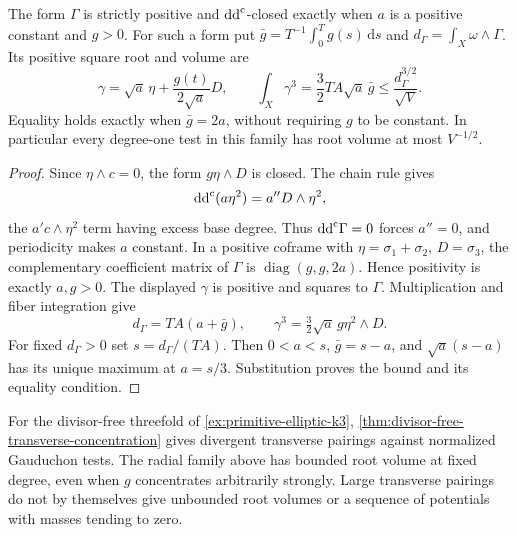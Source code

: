 \begin{proposition}\label{prop:primitive-radial-root-volume}
The form $\Gamma$ is strictly positive and $\mathrm{dd}^{\mathrm{c}}$-closed exactly when $a$ is a positive constant and $g>0$. For such a form put $\bar g=T^{-1}\int_0^Tg(s)\,\mathrm ds$ and $d_\Gamma=\int_X\omega\wedge\Gamma$. Its positive square root and volume are
\[
 \gamma=\sqrt a\,\eta+\frac{g(t)}{2\sqrt a}D,
 \qquad
 \int_X\gamma^3=\frac32TA\sqrt a\,\bar g
       \leq\frac{d_\Gamma^{3/2}}{\sqrt V}.
\]
Equality holds exactly when $\bar g=2a$, without requiring $g$ to be constant. In particular every degree-one test in this family has root volume at most $V^{-1/2}$.
\end{proposition}
\begin{proof}
Since $\eta\wedge c=0$, the form $g\eta\wedge D$ is closed. The chain rule gives
\[
 \mathrm{dd}^{\mathrm{c}}(a\eta^2)=a''D\wedge\eta^2,
\]
the $a'c\wedge\eta^2$ term having excess base degree. Thus $\mathrm{dd}^{\mathrm{c}}\Gamma=0$ forces $a''=0$, and periodicity makes $a$ constant. In a positive coframe with $\eta=\sigma_1+\sigma_2$, $D=\sigma_3$, the complementary coefficient matrix of $\Gamma$ is $\operatorname{diag}(g,g,2a)$. Hence positivity is exactly $a,g>0$.
The displayed $\gamma$ is positive and squares to $\Gamma$. Multiplication and fiber integration give
\[
 d_\Gamma=TA(a+\bar g),\qquad
 \gamma^3=\tfrac32\sqrt a\,g\eta^2\wedge D.
\]
For fixed $d_\Gamma>0$ set $s=d_\Gamma/(TA)$. Then $0<a<s$, $\bar g=s-a$, and $\sqrt a(s-a)$ has its unique maximum at $a=s/3$. Substitution proves the bound and its equality condition.
\end{proof}

For the divisor-free threefold of \cref{ex:primitive-elliptic-k3}, \cref{thm:divisor-free-transverse-concentration} gives divergent transverse pairings against normalized Gauduchon tests. The radial family above has bounded root volume at fixed degree, even when $g$ concentrates arbitrarily strongly. Large transverse pairings do not by themselves give unbounded root volumes or a sequence of potentials with masses tending to zero.
